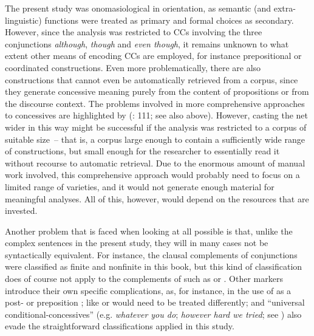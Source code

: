 The present study was onomasiological in orientation, as semantic (and extra-linguistic) functions were treated as primary and formal choices as secondary. However, since the analysis was restricted to CCs involving the three conjunctions \textit{although}, \textit{though} and \textit{even though}, it remains unknown to what extent other means of encoding CCs are employed, for instance prepositional or coordinated constructions. Even more problematically, there are also constructions that cannot even be automatically retrieved from a corpus, since they generate concessive meaning purely from the content of propositions or from the discourse context. The problems involved in more comprehensive approaches to concessives are highlighted by \citeauthor{Hoffmann2005} (\citeyear{Hoffmann2005}: 111; see also  above). However, casting the net wider in this way might be successful if the analysis was restricted to a corpus of suitable size~– that is, a corpus large enough to contain a sufficiently wide range of constructions, but small enough for the researcher to essentially read it without recourse to automatic retrieval. Due to the enormous amount of manual work involved, this comprehensive approach would probably need to focus on a limited range of varieties, and it would not generate enough material for meaningful  analyses. All of this, however, would depend on the resources that are invested.

Another problem that is faced when looking at all possible  is that, unlike the complex sentences in the present study, they will in many cases not be syntactically equivalent. For instance, the clausal complements of conjunctions were classified as finite and nonfinite in this book, but this kind of classification does of course not apply to the complements of  such as  or . Other markers introduce their own specific complications, as, for instance, in the use of  as a post- or preposition \citep{Schützler2018a};  like  or  would need to be treated differently; and “universal conditional-concessives” (e.g. \textit{whatever you do}; \textit{however hard we tried}; see ) also evade the straightforward classifications applied in this study.


